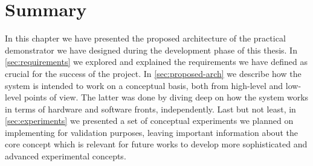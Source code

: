 \section{Summary} \label{sec:sys-arch-summary}

In this chapter we have presented the proposed architecture of the practical demonstrator we have designed during the development phase of this thesis.
In \autoref{sec:requirements} we explored and explained the requirements we have defined as crucial for the success of the project.
In \autoref{sec:proposed-arch} we describe how the system is intended to work on a conceptual basis, both from high-level and low-level points of view.
The latter was done by diving deep on how the system works in terms of hardware and software fronts, independently.
Last but not least, in \autoref{sec:experiments} we presented a set of conceptual experiments we planned on implementing for validation purposes, leaving important information about the core concept which is relevant for future works to develop more sophisticated and advanced experimental concepts.
